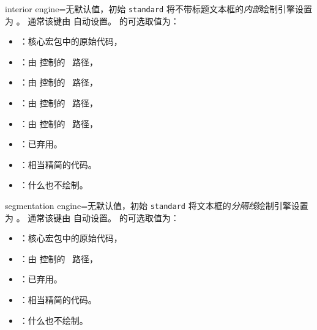 \clearpage
\begin{docTcbKey}{interior engine}{=}{无默认值，初始 \texttt{standard}}
  将不带标题文本框的\emph{内部}绘制引擎设置为 。
  通常该键由  自动设置。
   的可选取值为：
  \begin{itemize}
  \item{}：核心宏包中的原始代码，
  \item{}：由  控制的 \tikzname\ 路径，
  \item{}：由  控制的 \tikzname\ 路径，
  \item{}：由  控制的 \tikzname\ 路径，
  \item{}：由  控制的 \tikzname\ 路径，
  \item{}：已弃用。
  \item{}：相当精简的代码。
  \item{}：什么也不绘制。
  \end{itemize}
\end{docTcbKey}

\begin{docTcbKey}{segmentation engine}{=}{无默认值，初始 \texttt{standard}}
  将文本框的\emph{分隔线}绘制引擎设置为 。
  通常该键由  自动设置。
   的可选取值为：
  \begin{itemize}
  \item{}：核心宏包中的原始代码，
  \item{}：由  控制的 \tikzname\ 路径，
  \item{}：已弃用。
  \item{}：相当精简的代码。
  \item{}：什么也不绘制。
  \end{itemize}
\end{docTcbKey}

